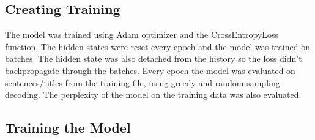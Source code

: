 \documentclass{article}
\begin{document}
\subsection{Creating Training}
The model was trained using Adam optimizer and the CrossEntropyLoss function. The hidden states were reset every epoch and the model was trained on batches. The hidden state was also detached from the history so the loss didn't backpropagate through the batches. Every epoch the model was evaluated on sentences/titles from the training file, using greedy and random sampling decoding. The perplexity of the model on the training data was also evaluated.
\subsection{Training the Model}
\begin{table}[ht]
\centering
{}
\caption{The best hyperparameters I found to make the model converge to less than 1.03 perplexity.}
\label{tab:hyper}
\end{table}
\end{document}
